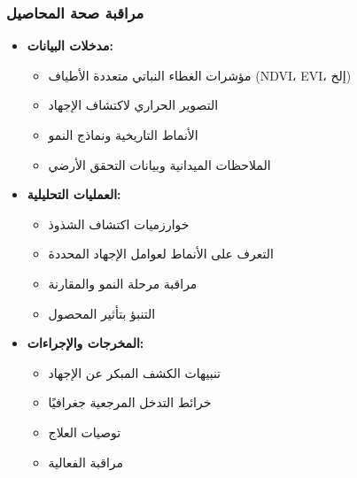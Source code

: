 \subsubsection{مراقبة صحة المحاصيل}
\begin{itemize}
    \item \textbf{مدخلات البيانات:}
    \begin{itemize}
        \item مؤشرات الغطاء النباتي متعددة الأطياف (NDVI، EVI، إلخ)
        \item التصوير الحراري لاكتشاف الإجهاد
        \item الأنماط التاريخية ونماذج النمو
        \item الملاحظات الميدانية وبيانات التحقق الأرضي
    \end{itemize}
    
    \item \textbf{العمليات التحليلية:}
    \begin{itemize}
        \item خوارزميات اكتشاف الشذوذ
        \item التعرف على الأنماط لعوامل الإجهاد المحددة
        \item مراقبة مرحلة النمو والمقارنة
        \item التنبؤ بتأثير المحصول
    \end{itemize}
    
    \item \textbf{المخرجات والإجراءات:}
    \begin{itemize}
        \item تنبيهات الكشف المبكر عن الإجهاد
        \item خرائط التدخل المرجعية جغرافيًا
        \item توصيات العلاج
        \item مراقبة الفعالية
    \end{itemize}
\end{itemize}

